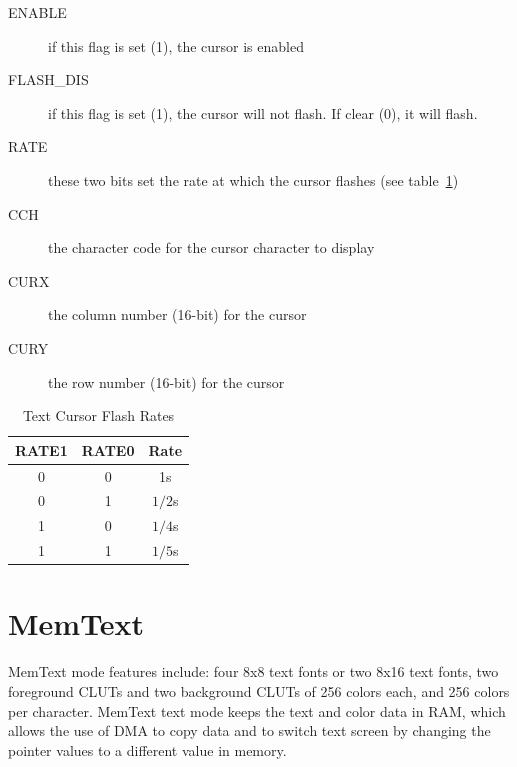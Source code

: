 \begin{description}
    \item[ENABLE] if this flag is set (1), the cursor is enabled

    \item[FLASH\_DIS] if this flag is set (1), the cursor will not flash. If clear (0), it will flash.

    \item[RATE] these two bits set the rate at which the cursor flashes (see table~\ref{tab:txt_crsr_rates})

    \item[CCH] the character code for the cursor character to display

    \item[CURX] the column number (16-bit) for the cursor

    \item[CURY] the row number (16-bit) for the cursor
\end{description}

\begin{table}[ht]
    \begin{center}
        \begin{tabular}{|c|c|c|} \hline
            RATE1 & RATE0 & Rate \\\hline\hline
            0 & 0 & 1s \\ \hline
            0 & 1 & $1/2$s \\ \hline
            1 & 0 & $1/4$s \\ \hline
            1 & 1 & $1/5$s \\ \hline
        \end{tabular}
    \end{center}
    \caption{Text Cursor Flash Rates}
    \label{tab:txt_crsr_rates}
\end{table}

\section*{MemText}


MemText mode features include: four 8x8 text fonts or two 8x16 text fonts, two foreground CLUTs and two background CLUTs of 256 colors each, and 256 colors per character.  MemText text mode keeps the text and color data in RAM, which allows the use of DMA to copy data and to switch text screen by changing the pointer values to a different value in memory.


